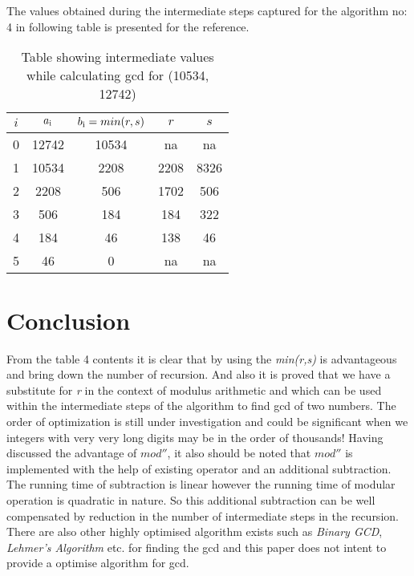 \documentclass[conference,compsoc]{IEEEtran}
\newcommand{\var}[1]{\textit{#1}}
\renewcommand{\mod}{\text{mod}}
\begin{document}
The values obtained during the intermediate steps captured for the algorithm no: 4 in following table is presented for the reference.
\begin{table}[!htbp]
\caption{Table showing intermediate values while calculating gcd for (10534, 12742)}
\label{table:4}
\centering
	\begin{tabular}{c | c | c | c| c}
	\hline
	$i$ & $a\textsubscript{i}$ & $b\textsubscript{i} = min(r,s)$ & $r$ & $s$\\ [0.5ex] 
	\hline
		0 & 12742 & 10534 & na   & na \\ 
		1 & 10534 & 2208  & 2208 & 8326\\  
		2 & 2208  & 506   & 1702 & 506\\
		3 & 506   & 184   & 184  & 322\\
		4 & 184   & 46    & 138  & 46\\
		5 & 46    & 0     & na   & na
	\end{tabular}
\end{table}

\section{Conclusion}
From the table 4 contents it is clear that by using the \var{min(r,s)} is advantageous and bring down the number of recursion. And also it is proved that we have a substitute for \var{r} in the context of modulus arithmetic and which can be used within the intermediate steps of the algorithm to find gcd of two numbers. The order of optimization is still under investigation and could be significant when we integers with very very long digits may be in the order of thousands! Having discussed the advantage of $mod''$, it also should be noted that $mod''$ is implemented with the help of existing \mod operator and an additional subtraction. The running time of subtraction is linear however the running time of modular operation is quadratic in nature. So this additional subtraction can be well compensated by reduction in the number of intermediate steps in the recursion. There are also other highly optimised algorithm exists such as \var{Binary GCD}, \var{Lehmer's Algorithm} etc. for finding the gcd and this paper does not intent to provide a optimise algorithm for gcd.
\end{document}
